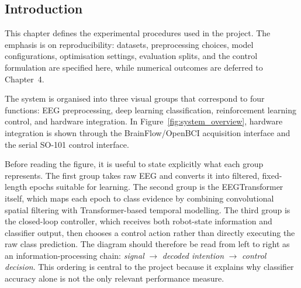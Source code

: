 \documentclass[12pt, a4paper]{article}
\begin{document}
\subsection{Introduction}

This chapter defines the experimental procedures used in the project. The emphasis is on reproducibility: datasets, preprocessing choices, model configurations, optimisation settings, evaluation splits, and the control formulation are specified here, while numerical outcomes are deferred to Chapter~4.

The system is organised into three visual groups that correspond to four functions: EEG preprocessing, deep learning classification, reinforcement learning control, and hardware integration. In Figure~\ref{fig:system_overview}, hardware integration is shown through the BrainFlow/OpenBCI acquisition interface and the serial SO-101 control interface.

Before reading the figure, it is useful to state explicitly what each group represents. The first group takes raw EEG and converts it into filtered, fixed-length epochs suitable for learning. The second group is the EEGTransformer itself, which maps each epoch to class evidence by combining convolutional spatial filtering with Transformer-based temporal modelling. The third group is the closed-loop controller, which receives both robot-state information and classifier output, then chooses a control action rather than directly executing the raw class prediction. The diagram should therefore be read from left to right as an information-processing chain: \emph{signal} $\rightarrow$ \emph{decoded intention} $\rightarrow$ \emph{control decision}. This ordering is central to the project because it explains why classifier accuracy alone is not the only relevant performance measure.
\end{document}
